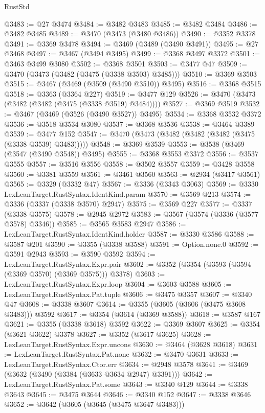 \begin{lexlean}{RustStd}
\begin{coremodule}
@3483 := @27 @3474
@3484 := @3482 @3483
@3485 := @3482 @3484
@3486 := @3482 @3485
@3489 := @3470 (@3473 (@3480 @3486))
@3490 := @3352 @3378
@3491 := @3369 @3478
@3494 := @3469 (@3489 (@3490 @3491))
@3495 := @27 @3468
@3497 := @3467 (@3494 @3495)
@3499 := @3368 @3497 @3372
@3501 := @3463 @3499 @3080
@3502 := @3368 @3501
@3503 := @3477 @47
@3509 := @3470 (@3473 (@3482 (@3475 (@3338 @3503) @3485)))
@3510 := @3369 @3503
@3515 := @3467 (@3469 (@3509 (@3490 @3510)) @3495)
@3516 := @3368 @3515
@3518 := @3363 (@3364 @227)
@3519 := @3477 @129
@3526 := @3470 (@3473 (@3482 (@3482 (@3475 (@3338 @3519) @3484))))
@3527 := @3369 @3519
@3532 := @3467 (@3469 (@3526 (@3490 @3527)) @3495)
@3534 := @3368 @3532 @3372
@3536 := @3518 @3534 @3080
@3537 := @3368 @3536
@3538 := @3464 @3389
@3539 := @3477 @152
@3547 := @3470 (@3473 (@3482 (@3482 (@3482 (@3475 (@3338 @3539) @3483)))))
@3548 := @3369 @3539
@3553 := @3538 (@3469 (@3547 (@3490 @3548)) @3495)
@3555 := @3368 @3553 @3372
@3556 := @3537 @3555
@3557 := @3516 @3556
@3558 := @3502 @3557
@3559 := @3428 @3558
@3560 := @3381 @3559
@3561 := @3461 @3560
@3563 := @2934 (@3417 @3561)
@3565 := @3329 (@3332 @47)
@3567 := @3336 (@3343 @3063)
@3569 := @3330 LexLeanTarget.RustSyntax.IdentKind.param
@3570 := @3569 @213
@3574 := @3336 (@3337 (@3338 @3570) @2947)
@3575 := @3569 @227
@3577 := @3337 (@3338 @3575)
@3578 := @2945 @2972
@3583 := @3567 (@3574 (@3336 (@3577 @3578) @3346))
@3585 := @3565 @3583 @2947
@3586 := LexLeanTarget.RustSyntax.IdentKind.holder
@3587 := @3330 @3586
@3588 := @3587 @201
@3590 := @3355 (@3338 @3588)
@3591 := Option.none.{0}
@3592 := @3591 @2943
@3593 := @3590 @3592
@3594 := LexLeanTarget.RustSyntax.Expr.pair
@3602 := @3352 (@3354 (@3593 (@3594 (@3369 @3570) (@3369 @3575))) @3378)
@3603 := LexLeanTarget.RustSyntax.Expr.loop
@3604 := @3603 @3588
@3605 := LexLeanTarget.RustSyntax.Pat.tuple
@3606 := @3475 @3357
@3607 := @3340 @47
@3608 := @3338 @3607
@3614 := @3355 (@3605 (@3606 (@3475 @3608 @3483))) @3592
@3617 := @3354 (@3614 (@3369 @3588))
@3618 := @3587 @167
@3621 := @3355 (@3338 @3618) @3592
@3622 := @3369 @3607
@3625 := @3354 (@3621 @3622) @3378
@3627 := @3352 (@3617 @3625)
@3628 := LexLeanTarget.RustSyntax.Expr.uncons
@3630 := @3464 (@3628 @3618)
@3631 := LexLeanTarget.RustSyntax.Pat.none
@3632 := @3470 @3631
@3633 := LexLeanTarget.RustSyntax.Ctor.err
@3634 := @2948 @3578
@3641 := @3469 (@3632 (@3490 (@3384 (@3633 @3634 @2947) @3391)))
@3642 := LexLeanTarget.RustSyntax.Pat.some
@3643 := @3340 @129
@3644 := @3338 @3643
@3645 := @3475 @3644
@3646 := @3340 @152
@3647 := @3338 @3646
@3652 := @3642 (@3605 (@3645 (@3475 @3647 @3483)))

\end{coremodule}
\end{lexlean}

